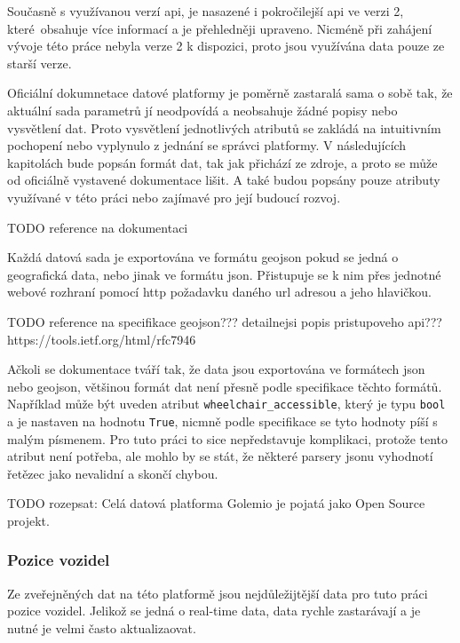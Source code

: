 \bigbreak

Současně s využívanou verzí \gls{api}, je nasazené i pokročilejší \gls{api} ve verzi 2, které obsahuje více informací a je přehledněji upraveno. Nicméně při zahájení vývoje této práce nebyla verze 2 k dispozici, proto jsou využívána data pouze ze starší verze.

\bigbreak

Oficiální dokumnetace datové platformy je poměrně zastaralá sama o sobě tak, že aktuální sada parametrů jí neodpovídá a neobsahuje žádné popisy nebo vysvětlení dat. Proto vysvětlení jednotlivých atributů se zakládá na intuitivním pochopení nebo vyplynulo z jednání se správci platformy. V následujících kapitolách bude popsán formát dat, tak jak přichází ze zdroje, a proto se může od oficiálně vystavené dokumentace lišit. A také budou popsány pouze atributy využívané v této práci nebo zajímavé pro její budoucí rozvoj.

TODO reference na dokumentaci

\bigbreak

Každá datová sada je exportována ve formátu \gls{geojson} pokud se jedná o geografická data, nebo jinak ve formátu \gls{json}. Přistupuje se k nim přes jednotné webové rozhraní pomocí \gls{http} požadavku daného \gls{url} adresou a jeho hlavičkou.

TODO reference na specifikace geojson??? detailnejsi popis pristupoveho api??? https://tools.ietf.org/html/rfc7946

\bigbreak

Ačkoli se dokumentace tváří tak, že data jsou exportována ve formátech \gls{json} nebo \gls{geojson}, většinou formát dat není přesně podle specifikace těchto formátů. Například může být uveden atribut \verb"wheelchair_accessible", který je typu \verb"bool" a je nastaven na hodnotu \verb"True", nicmně podle specifikace se tyto hodnoty píší s malým písmenem. Pro tuto práci to sice nepředstavuje komplikaci, protože tento atribut není potřeba, ale mohlo by se stát, že některé parsery \gls{json}u vyhodnotí řetězec jako nevalidní a skončí chybou.

\bigbreak

TODO rozepsat: Celá datová platforma Golemio je pojatá jako Open Source projekt.

\subsubsection{Pozice vozidel}

Ze zveřejněných dat na této platformě jsou nejdůležijtější data pro tuto práci pozice vozidel. Jelikož se jedná o real-time data, data rychle zastarávají a je nutné je velmi často aktualizaovat.

